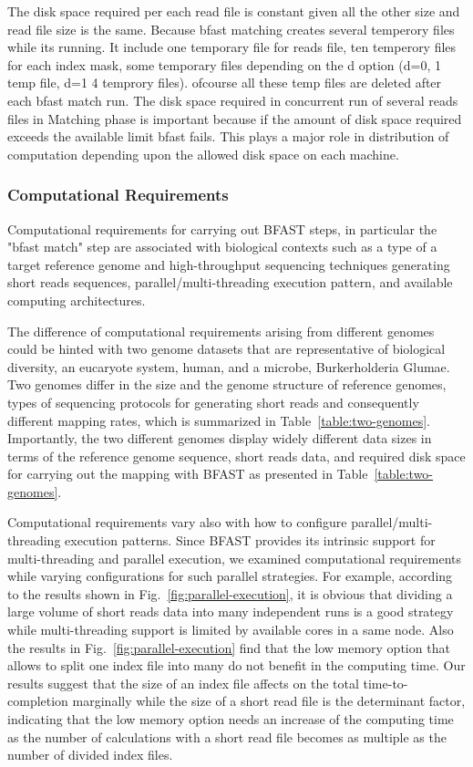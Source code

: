 \documentclass{acm_proc_article-sp}
\begin{document}
The disk space required per each read file is constant given all the other size and read file size is the same. Because bfast matching creates several temperory files while its running. It include one temporary file for reads file, ten temperory files for each index mask, some temporary files depending on the d option (d=0, 1 temp file, d=1 4 temprory files). ofcourse all these temp files are deleted after each bfast match run. The disk space required in concurrent run of several reads files in Matching phase is important because if the amount of disk space required exceeds the available limit bfast fails. This plays a major role in distribution of computation depending upon the allowed disk space on each machine. 

\subsubsection{Computational Requirements}

Computational requirements for carrying out BFAST steps, in particular the "bfast match" step are associated with biological contexts such as a type of a target reference genome and high-throughput sequencing techniques generating short reads sequences, parallel/multi-threading execution pattern, and available computing architectures.  

The difference of computational requirements arising from different genomes could be hinted with two genome datasets that are representative of biological diversity, an eucaryote system, human, and a microbe, Burkerholderia Glumae\cite{kim2011}.  Two genomes differ in the size and the genome structure of reference genomes, types of sequencing protocols for generating short reads and consequently different mapping rates, which is summarized in Table~\ref{table:two-genomes}.  Importantly, the two different genomes display widely different data sizes in terms of the reference genome sequence, short reads data, and required disk space for carrying out the mapping with BFAST as presented in Table~\ref{table:two-genomes}. 

Computational requirements vary also with how to configure parallel/multi-threading execution patterns.  Since BFAST provides its intrinsic support for multi-threading and parallel execution, we examined computational requirements while varying configurations for such parallel strategies.  For example, according to the results shown in Fig.~\ref{fig:parallel-execution}, it is obvious that dividing a large volume of short reads data into many independent runs is a good strategy while multi-threading support is limited by available cores in a same node.  Also the results in Fig.~\ref{fig:parallel-execution} find that the low memory option that allows to split one index file into many do not benefit in the computing time. Our results suggest that the size of an index file affects on the total time-to-completion marginally while the size of a short read file is the determinant factor, indicating that the low memory option needs an increase of the computing time as the number of calculations with a short read file becomes as multiple as the number of divided index files.   
\end{document}
